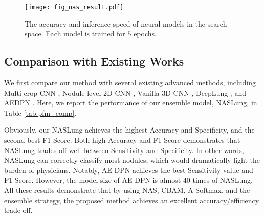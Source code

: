 \documentclass[final,5p,times,twocolumn]{elsarticle}
\begin{document}
\begin{figure}
\centering
\texttt{[image: fig\_nas\_result.pdf]} \\
\caption{The accuracy and inference speed of neural models in the search space. Each model is trained for $5$ epochs.}
\label{fig:space}
\end{figure}


\subsection{Comparison with Existing Works}
\label{ssec:exp_comp}

We first compare our method with several existing advanced methods, including Multi-crop CNN \citep{shen2017multi}, Nodule-level 2D CNN \citep{yan2016classification}, Vanilla 3D CNN \citep{yan2016classification}, DeepLung \citep{zhu2018deeplung}, and AEDPN \citep{JIANG2019AEDPN}. Here, we report the performance of our ensemble model, NASLung, in Table \ref{tab:pfm_comp}. 

Obviously, our NASLung achieves the highest Accuracy and Specificity, and the second best F1 Score. Both high Accuracy and F1 Score demonstrates that NASLung  trades off well between Sensitivity and Specificity. In other words, NASLung  can correctly classify most nodules, which would dramatically light the burden of physicians. 
Notably, AE-DPN \citep{JIANG2019AEDPN} achieves the best Sensitivity value and F1 Score. However, the model size of AE-DPN is almost 40 times of NASLung. 
All these results demonstrate that by using NAS, CBAM, A-Softmax, and the ensemble strategy, the proposed method achieves an excellent accuracy/efficiency trade-off. 
\end{document}
